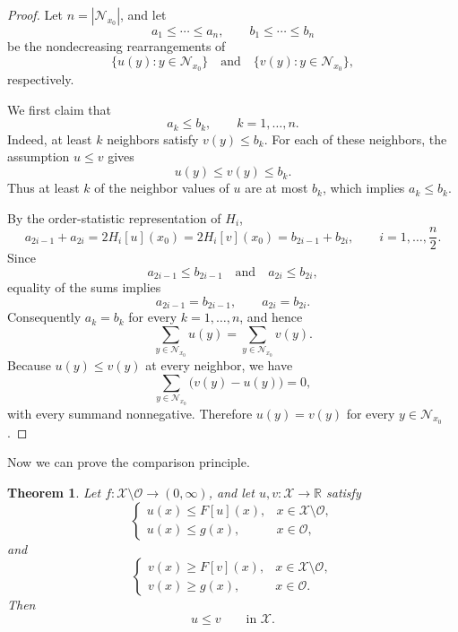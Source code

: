 \documentclass[reqno,11pt]{amsart}
\numberwithin{equation}{section}
\newtheorem{theorem}{Theorem}[section]
\theoremstyle{definition}
\theoremstyle{remark}
\begin{document}
\begin{proof}
Let \(n=|\mathcal N_{x_0}|\), and let
\[
    a_1\le\cdots\le a_n,
    \qquad
    b_1\le\cdots\le b_n
\]
be the nondecreasing rearrangements of
\[
    \{u(y):y\in\mathcal N_{x_0}\}
    \quad\text{and}\quad
    \{v(y):y\in\mathcal N_{x_0}\},
\]
respectively.

We first claim that
\[
    a_k\le b_k,\qquad k=1,\dots,n.
\]
Indeed, at least \(k\) neighbors satisfy \(v(y)\le b_k\). For each of
these neighbors, the assumption \(u\le v\) gives
\[
    u(y)\le v(y)\le b_k.
\]
Thus at least \(k\) of the neighbor values of \(u\) are at most \(b_k\),
which implies \(a_k\le b_k\).

By the order-statistic representation of \(H_i\),
\[
    a_{2i-1}+a_{2i}
    =
    2H_i[u](x_0)
    =
    2H_i[v](x_0)
    =
    b_{2i-1}+b_{2i},
    \qquad i=1,\dots,\frac n2.
\]
Since
\[
    a_{2i-1}\le b_{2i-1}
    \quad\text{and}\quad
    a_{2i}\le b_{2i},
\]
equality of the sums implies
\[
    a_{2i-1}=b_{2i-1},
    \qquad
    a_{2i}=b_{2i}.
\]
Consequently \(a_k=b_k\) for every \(k=1,\dots,n\), and hence
\[
    \sum_{y\in\mathcal N_{x_0}}u(y)
    =
    \sum_{y\in\mathcal N_{x_0}}v(y).
\]
Because \(u(y)\le v(y)\) at every neighbor, we have
\[
    \sum_{y\in\mathcal N_{x_0}}\bigl(v(y)-u(y)\bigr)=0,
\]
with every summand nonnegative. Therefore \(u(y)=v(y)\) for every
\(y\in\mathcal N_{x_0}\).
\end{proof}

Now we can prove the comparison principle.

\begin{theorem}\label{thm:comparison-principle}
Let \(f\colon\mathcal X\setminus\mathcal O
\to(0,\infty)\), and let \(u,v\colon\mathcal X\to\mathbb R\) satisfy
\begin{equation}\label{eq:bvp-sub}
    \begin{cases}
        \displaystyle
        u(x) \leq F[u](x),
        & x\in\mathcal X\setminus\mathcal O,\\[3ex]
        u(x)\leq g(x),
        & x\in\mathcal O,
    \end{cases}
\end{equation}
and
\begin{equation}\label{eq:bvp-super}
    \begin{cases}
        \displaystyle
        v(x) \geq F[v](x),
        & x\in\mathcal X\setminus\mathcal O,\\[3ex]
        v(x)\geq g(x),
        & x\in\mathcal O.
    \end{cases}
\end{equation}
Then
\[
    u\leq v
    \qquad\text{in }\mathcal X.
\]
\end{theorem}
\end{document}
